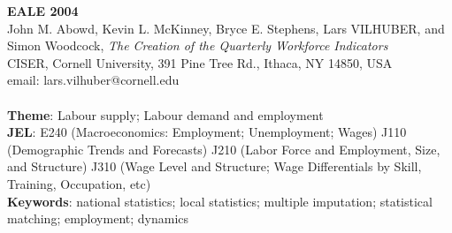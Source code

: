 \documentclass[10pt]{article}
\newcommand{\mytitle}{The Creation of the Quarterly Workforce Indicators }
\newcommand{\myauthors}{John M. Abowd, Kevin L. McKinney, Bryce
  E. Stephens, Lars VILHUBER, and Simon Woodcock}
\begin{document}
{\bf EALE 2004}\\
\myauthors, {\it \mytitle}\\
CISER, Cornell University, 391 Pine Tree Rd., Ithaca, NY 14850,  USA\\
email: lars.vilhuber@cornell.edu\\
\ \\
{\bf Theme}: Labour supply; Labour demand and employment\\
{\bf JEL}: E240 (Macroeconomics: Employment; Unemployment; Wages) J110
(Demographic Trends and Forecasts) J210 (Labor Force and Employment, Size,
and Structure) J310 (Wage Level and Structure; Wage Differentials by Skill,
Training, Occupation, etc) \\
{\bf Keywords}: national statistics; local statistics; multiple imputation; statistical
matching; employment; dynamics\\
\end{document}
